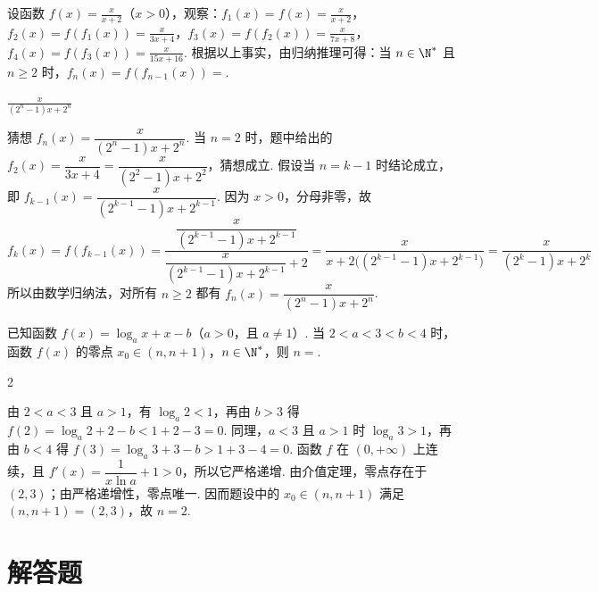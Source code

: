 \begin{problem}
设函数 \(f(x) = \frac{x}{x + 2}\)（\(x > 0\)），观察：\(f_{1}(x) = f(x) = \frac{x}{x + 2}\)，\(f_{2}(x) = f\!\left(f_{1}(x)\right) = \frac{x}{3x + 4}\)，\(f_{3}(x) = f\!\left(f_{2}(x)\right) = \frac{x}{7x + 8}\)，\(f_{4}(x) = f\!\left(f_{3}(x)\right) = \frac{x}{15x + 16}\). 根据以上事实，由归纳推理可得：当 \(n \in \N^{*}\) 且 \(n \geqslant 2\) 时，\(f_n(x) = f(f_{n-1}(x)) =\)\fillinblank{}.
\end{problem}

\begin{answer}
\(\displaystyle \frac{x}{(2^{n}-1)x+2^{n}}\)
\end{answer}

\begin{solution}
猜想
\(f_n(x)=\dfrac{x}{(2^n-1)x+2^n}\). 当 \(n=2\) 时，题中给出的
\(f_2(x)=\dfrac{x}{3x+4}=\dfrac{x}{(2^2-1)x+2^2}\)，猜想成立.
假设当 \(n=k-1\) 时结论成立，即
\(f_{k-1}(x)=\dfrac{x}{(2^{k-1}-1)x+2^{k-1}}\). 因为 \(x>0\)，分母非零，故
\[
f_k(x)=f\left(f_{k-1}(x)\right)
=\frac{\dfrac{x}{(2^{k-1}-1)x+2^{k-1}}}
{\dfrac{x}{(2^{k-1}-1)x+2^{k-1}}+2}
=\frac{x}{x+2\bigl((2^{k-1}-1)x+2^{k-1}\bigr)}
=\frac{x}{(2^k-1)x+2^k}
\]
所以由数学归纳法，对所有 \(n\geqslant2\) 都有
\(f_n(x)=\dfrac{x}{(2^n-1)x+2^n}\).
\end{solution}

\begin{problem}
已知函数 \( f(x) = \log_a x + x - b \)（\(a > 0\)，且 \(a \neq 1\)）. 当 \( 2 < a < 3 < b < 4 \) 时，函数 \( f(x) \) 的零点 \(x_0 \in (n, n+1)\)，\(n \in \N^{*}\)，则 \( n = \)\fillinblank{}.
\end{problem}

\begin{answer}
2
\end{answer}

\begin{solution}
由 \(2<a<3\) 且 \(a>1\)，有 \(\log_a2<1\)，再由 \(b>3\) 得
\(f(2)=\log_a2+2-b<1+2-3=0\).
同理，\(a<3\) 且 \(a>1\) 时 \(\log_a3>1\)，再由 \(b<4\) 得
\(f(3)=\log_a3+3-b>1+3-4=0\).
函数 \(f\) 在 \((0,+\infty)\) 上连续，且
\(f'(x)=\dfrac1{x\ln a}+1>0\)，所以它严格递增. 由介值定理，零点存在于 \((2,3)\)；由严格递增性，零点唯一. 因而题设中的 \(x_0\in(n,n+1)\) 满足 \((n,n+1)=(2,3)\)，故 \(n=2\).
\end{solution}

\section{解答题}

